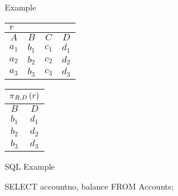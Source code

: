 \begin{multicols}{2}
\begin{CheatsheetEntryFrame}
        \SubsectionFrameRemoveSeparation
        \begin{RelAlgSubsection}{Example}
        \begin{center}
            {\footnotesize%
                \begin{tabular}{|cccc|}
                    \multicolumn{4}{l}{\normalsize $r$}
                        \\ \hline
                    \multicolumn{1}{|c}{$A$}
                        & \multicolumn{1}{c}{$B$}
                        & \multicolumn{1}{c}{$C$}
                        & \multicolumn{1}{c|}{$D$}
                        \\ \hline\hline
                    $a_1$ & $b_1$ & $c_1$ & $d_1$ \\
                    $a_2$ & $b_2$ & $c_2$ & $d_2$ \\
                    $a_3$ & $b_3$ & $c_3$ & $d_3$ \\ \hline
                \end{tabular}
                \qquad \qquad
                \begin{tabular}{|cc|}
                    \multicolumn{2}{l}{\normalsize $\operatorname{\pi}_{B, D}{(r)}$}
                        \\ \hline
                    \multicolumn{1}{|c}{$B$}
                        & \multicolumn{1}{c|}{$D$}
                        \\ \hline\hline
                    $b_1$ & $d_1$ \\
                    $b_2$ & $d_2$ \\
                    $b_3$ & $d_3$ \\ \hline
                \end{tabular}
            }
        \end{center}
        \end{RelAlgSubsection}
        \SubsectionFrameReduceSkip
        \begin{SqlSubsection}{SQL Example}
            \begin{CheatsheetSubsectionLst}
                SELECT accountno, balance
                FROM Accounts;
            \end{CheatsheetSubsectionLst}

            \medskip


\end{SqlSubsection}
\end{CheatsheetEntryFrame}
\end{multicols}
